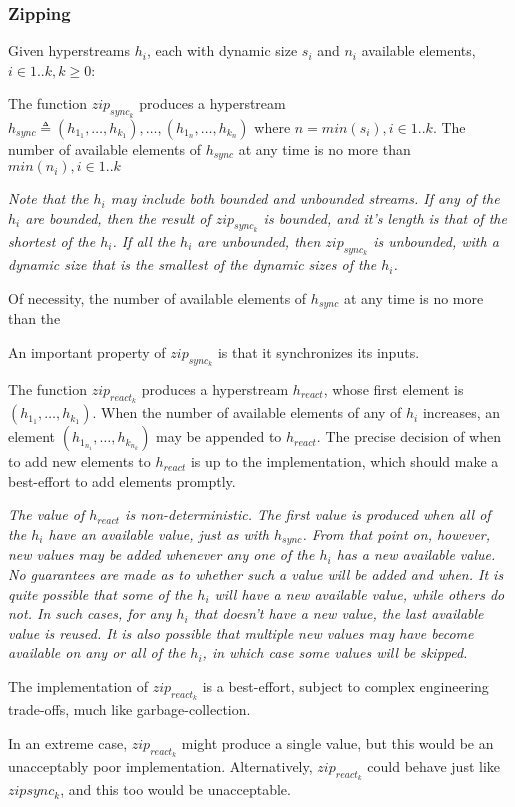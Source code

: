 \documentclass{article}
\begin{document}
\subsubsection{Zipping}
\label{zipping}

Given hyperstreams $h_i$, each with dynamic size $s_i$ and $n_i$  available elements, $ i \in 1..k, k \ge 0$:

 The function $zip_{sync_k}$ produces a hyperstream $h_{sync} \triangleq (h_{1_1}, \ldots, h_{k_1}), \ldots, (h_{1_n}, \ldots, h_{k_n})$ where $n = min(s_i), i \in 1..k$.
 The number of available elements of $h_{sync}$ at any time is no more than $min(n_i), i \in 1..k$

{\em
Note that the $h_i$ may include both bounded and unbounded streams. If any of the $h_i$ are bounded, then the result of $zip_{sync_k}$ is bounded, and it's length is that of the shortest of the $h_i$. If all  the $h_i$ are unbounded, then $zip_{sync_k}$ is unbounded, with a dynamic size that is the smallest of the dynamic sizes of the $h_i$.

Of necessity, the number of available elements of $h_{sync}$ at any time is no more than the

An important property of $zip_{sync_k}$ is that it synchronizes its inputs.
}

The function $zip_{react_k}$  produces a hyperstream $h_{react}$, whose first element is $(h_{1_1}, \ldots, h_{k_1})$. When the number of available elements of any of $h_i$ increases, an element $(h_{1_{n_1}}, \ldots, h_{k_{n_k}})$ may be appended to $h_{react}$. The precise decision of when to add new elements to $h_{react}$ is up to the
implementation, which should make a best-effort to add elements promptly.

{\em
The value of $h_{react}$ is non-deterministic. The first value is produced when all of the $h_i$ have an available value, just as with $h_{sync}$. From that point on, however,
new values may be added whenever any one of the $h_i$ has a new available value. No guarantees are made as to whether such a value will be added and when. It is quite possible that some of the $h_i$ will have a new available value, while others do not. In such cases, for any $h_i$ that doesn't have a new value,  the last available value is reused.
It is also possible that multiple new values may have become available on any or all of the $h_i$, in which case some values will be skipped.

The implementation of $zip_{react_k}$ is a best-effort, subject to complex engineering trade-offs, much like garbage-collection.

In an extreme case, $zip_{react_k}$ might produce a single value, but this would be an unacceptably poor implementation. Alternatively, $zip_{react_k}$ could behave just like 
$zip{sync_k}$, and this too would be unacceptable.
}
\end{document}
